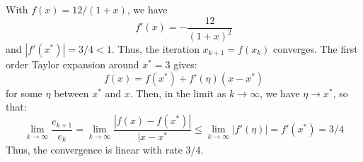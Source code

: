 \documentclass{homework}
\begin{document}
\begin{letterenum}
\item With $f(x) = 12 / (1 + x)$, we have
\begin{equation*}
    f'(x) = - \frac{12}{(1+x)^2}
\end{equation*}
and $|f'(x^*)| = 3/4 < 1$. Thus, the iteration $x_{k+1} = f(x_k)$ converges. The first order
Taylor expansion around $x^* = 3$ gives:
\begin{equation*}
    f(x) = f(x^*) + f'(\eta) (x - x^*)
\end{equation*}
for some $\eta$ between $x^*$ and $x$. Then, in the limit as $k\to\infty$, we have $\eta \to x^*$,
so that:
\begin{equation*}
    \lim_{k\to\infty} \frac{e_{k+1}}{e_k} = \lim_{k\to\infty} \frac{|f(x) - f(x^*)|}{|x - x^*}
        \leq \lim_{k\to\infty} \biggl| f'(\eta)\biggr| = f'(x^*) = 3/4
\end{equation*}
Thus, the convergence is linear with rate 3/4.

\end{letterenum}
\end{document}
